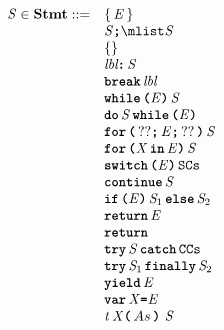 \documentclass[a4paper,oneside,fleqn]{article}
\newcommand{\synt}[1]{\ensuremath{\text{\textbf{\texttt{#1}}}}}
\newcommand{\dstmt}{\mathbf{Stmt}}
\newcommand{\idmeta}{\ensuremath{\mathit{X}}}
\newcommand{\typemeta}{\ensuremath{\mathit{t}}}
\begin{document}
\newcommand{\LabeledStatement}[2]{#1\synt{:}\, #2}
\newcommand{\BreakStatement}[1]{\synt{break}\, #1}
\newcommand{\WhileStatement}[2]{\synt{while}\, \synt{(}#1\synt{)}\, #2}
\newcommand{\DoStatement}[2]{\synt{do}\, #1\, \synt{while}\, \synt{(}#2\synt{)}}
\newcommand{\ForStatement}[4]{\synt{for}\, \synt{(}\,#1\synt{;}\, #2\synt{;}\, #3\,\synt{)}\, #4}
\newcommand{\ForInStatement}[3]{\synt{for}\,\synt{(}#1\,\synt{in}\,#2\synt{)}\,#3}

\newcommand{\SwitchStatement}[2]{\synt{switch}\,\synt{(}#1\synt{)}\,#2}
\newcommand{\ContinueSwitchStatement}[1]{\synt{continue}\,#1}
\newcommand{\IfStatement}[3]{\synt{if}\,\synt{(}#1\synt{)}\,#2\,\synt{else}\,#3}
\newcommand{\ReturnStatement}[1]{\synt{return}\,#1}

\newcommand{\TryCatch}[2]{\synt{try}\,#1\,\synt{catch}\,#2}
\newcommand{\TryFinally}[2]{\synt{try}\,#1\,\synt{finally}\,#2}

\newcommand{\Yield}[1]{\synt{yield}\,#1}

\newcommand{\VarDeclaration}[2]{\synt{var}\,#1\synt{=}#2}
\newcommand{\FunctionDeclaration}[5]{#1\,#2\synt{(}\,#3\,\synt{)}\,#4\,#5}

\[
\begin{array}{rl}

  \statementmeta \in \dstmt ::=
  & \ExpressionStatement{\expressionmeta} \\
  & \Block{\statementmeta} \\
  & \EmptyStatement \\
  & \LabeledStatement{\lbl}{\statementmeta} \\
  & \BreakStatement{\lbl} \\
  & \WhileStatement{\expressionmeta}{\statementmeta} \\
  & \DoStatement{\statementmeta}{\expressionmeta} \\
  & \ForStatement{??}{\expressionmeta}{??}{\statementmeta} \\
  & \ForInStatement{\idmeta}{\expressionmeta}{\statementmeta} \\
  & \SwitchStatement{\expressionmeta}{\tt{SCs}} \\
  & \ContinueSwitchStatement{\statementmeta} \\
  & \IfStatement{\expressionmeta}{\statementmeta_1}{\statementmeta_2} \\
  & \ReturnStatement{\expressionmeta} \\
  & \ReturnStatement{} \\
  & \TryCatch{\statementmeta}{\tt{CCs}} \\
  & \TryFinally{\statementmeta_1}{\statementmeta_2} \\
  & \Yield{\expressionmeta} \\
  & \VarDeclaration{\idmeta}{\expressionmeta} \\
  & \FunctionDeclaration{\typemeta}{\idmeta}{\formals}{}{\stmt} \\

\end{array}
\]
\end{document}
